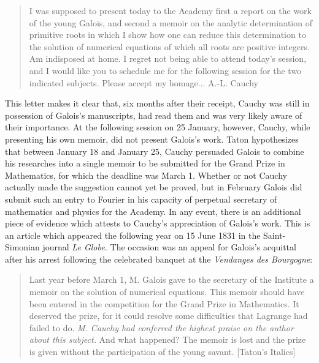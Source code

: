 \documentclass[12pt]{article}
\begin{document}
\begin{quote}
I was supposed to present today to the Academy first a report on the work of the young Galois, and second a memoir on the analytic determination of primitive roots in which I show how one can reduce this determination to the solution of numerical equations of which all roots are positive integers. Am indisposed at home. I regret not being able to attend today's session, and I would like you to schedule me for the following session for the two indicated subjects. Please accept my homage...  \hfill A.-L. Cauchy
\end{quote}
This letter makes it clear that, six months after their receipt, Cauchy was still in possession of Galois's manuscripts, had read them and was very likely aware of their importance. At the following session on 25 January, however, Cauchy, while presenting his own memoir, did not present Galois's work. Taton hypothesizes that between January 18 and January 25, Cauchy persuaded Galois to combine his researches into a single memoir to be submitted for the Grand Prize in Mathematics, for which the deadline was March 1. Whether or not Cauchy actually made the suggestion cannot yet be proved, but in February Galois did submit such an entry to Fourier in his capacity of perpetual secretary of mathematics and physics for the Academy. In any event, there is an additional piece of evidence which attests to Cauchy's appreciation of Galois's work. This is an article which appeared the following year on 15 June 1831 in the Saint-Simonian journal {\em Le Globe.} The occasion was an appeal for Galois's acquittal after his arrest following the celebrated banquet at the \emph{Vendanges des Bourgogne}:

\begin{quote}
Last year before March 1, M. Galois gave to the secretary of the Institute a memoir on the solution of numerical equations. This memoir should have been entered in the competition for the Grand Prize in Mathematics. It deserved the prize, for it could resolve some difficulties that Lagrange had failed to do. \emph{M. Cauchy had conferred the highest praise on the author about this subject.} And what happened? The memoir is lost and the prize is given without the participation of the young savant. [Taton's Italics]
\end{quote}
\end{document}
